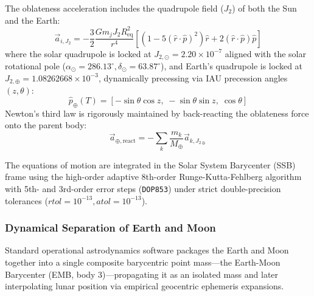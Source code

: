 \documentclass[11pt,a4paper]{article}
\begin{document}
The oblateness acceleration includes the quadrupole field ($J_2$) of both the Sun and the Earth:
\begin{equation}
\vec{a}_{i,J_2} = -\frac{3}{2} \frac{G m_j J_2 R_{\text{eq}}^2}{r^4} \left[ \left(1 - 5(\hat{r} \cdot \hat{p})^2\right) \hat{r} + 2(\hat{r} \cdot \hat{p}) \hat{p} \right]
\label{eq:j2_acceleration}
\end{equation}
where the solar quadrupole is locked at $J_{2,\odot} = 2.20 \times 10^{-7}$ aligned with the solar rotational pole ($\alpha_\odot = 286.13^\circ, \delta_\odot = 63.87^\circ$), and Earth's quadrupole is locked at $J_{2,\oplus} = 1.08262668 \times 10^{-3}$, dynamically precessing via IAU precession angles $(z, \theta)$:
\begin{equation}
\hat{p}_\oplus(T) = [-\sin\theta\cos z, \; -\sin\theta\sin z, \; \cos\theta]
\label{eq:earth_pole_precession}
\end{equation}
Newton's third law is rigorously maintained by back-reacting the oblateness force onto the parent body:
\begin{equation}
\vec{a}_{\oplus,\text{react}} = -\sum_k \frac{m_k}{M_\oplus} \vec{a}_{k,J_{2\oplus}}
\label{eq:newton_third_reaction}
\end{equation}

The equations of motion are integrated in the Solar System Barycenter (SSB) frame using the high-order adaptive 8th-order Runge-Kutta-Fehlberg algorithm with 5th- and 3rd-order error steps (\texttt{DOP853}) under strict double-precision tolerances ($rtol = 10^{-13}, atol = 10^{-13}$).

\subsubsection{Dynamical Separation of Earth and Moon}
\label{subsubsec:earth_moon_separation}

Standard operational astrodynamics software packages the Earth and Moon together into a single composite barycentric point mass---the Earth-Moon Barycenter (EMB, body 3)---propagating it as an isolated mass and later interpolating lunar position via empirical geocentric ephemeris expansions.
\end{document}
